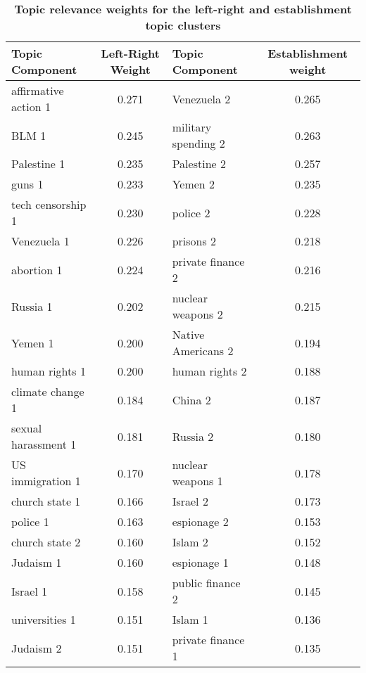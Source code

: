\documentclass[10pt,letterpaper]{article}
\begin{document}
\clearpage
\begin{table}[h]
\caption{\bf{Topic relevance weights for the left-right and establishment topic clusters}
\label{RelevanceTable}}
\begin{tabular}{|l|c|l|c|}
\hline
Topic Component & Left-Right Weight & Topic Component & Establishment weight\\\hline
affirmative action 1 & 0.271 & Venezuela   2        & 0.265 \\
BLM 1       & 0.245 & military spending 2  & 0.263    \\
Palestine 1          & 0.235 & Palestine 2          & 0.257               \\
guns 1               & 0.233 & Yemen 2              & 0.235               \\ 
tech censorship 1         & 0.230 & police 2             & 0.228               \\ 
Venezuela 1          & 0.226 & prisons 2            & 0.218               \\ 
abortion 1           & 0.224 & private finance 2    & 0.216               \\ 
Russia 1             & 0.202 & nuclear weapons 2    & 0.215               \\ 
Yemen 1              & 0.200 & Native Americans 2   & 0.194               \\ 
human rights 1       & 0.200 & human rights 2       & 0.188               \\ 
climate change 1     & 0.184 & China 2              & 0.187               \\ 
sexual harassment 1  & 0.181 & Russia 2             & 0.180               \\ 
US immigration 1     & 0.170 & nuclear weapons 1    & 0.178               \\ 
church state 1       & 0.166 & Israel 2             & 0.173               \\ 
police 1             & 0.163 & espionage 2          & 0.153               \\ 
church state 2       & 0.160 & Islam 2              & 0.152               \\ 
Judaism 1            & 0.160 & espionage 1          & 0.148               \\ 
Israel 1             & 0.158 & public finance 2     & 0.145               \\ 
universities 1       & 0.151 & Islam 1              & 0.136               \\ 
Judaism 2            & 0.151 & private finance 1    & 0.135               \\ 

\end{tabular}
\end{table}
\end{document}
